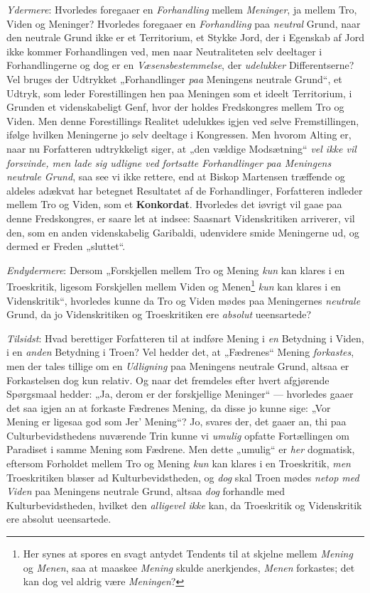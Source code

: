 \documentclass[12pt,a4paper]{book}
\newcommand{\opage}[1]{\marginnote{\footnotesize\textit{[#1]}}}
\begin{document}
\emph{Ydermere}: Hvorledes foregaaer en \emph{Forhandling}
mellem \emph{Meninger}, ja mellem Tro, Viden og
Meninger? Hvorledes foregaaer en \emph{Forhandling} paa
\emph{neutral} Grund, naar den neutrale Grund ikke er et
Territorium, et Stykke Jord, der i Egenskab af Jord
ikke kommer Forhandlingen ved, men naar Neutraliteten
selv deeltager i Forhandlingerne og dog er en \emph{Væsensbestemmelse},
der \emph{udelukker} Differentserne? Vel
bruges der Udtrykket „Forhandlinger \emph{paa} Meningens
neutrale Grund“, et Udtryk, som leder Forestillingen
hen paa Meningen som et ideelt Territorium, i Grunden
et videnskabeligt Genf, hvor der holdes Fredskongres
mellem Tro og Viden. Men denne Forestillings Realitet
udelukkes igjen ved selve Fremstillingen, ifølge hvilken
Meningerne jo selv deeltage i Kongressen. Men hvorom
Alting er, naar nu Forfatteren udtrykkeligt siger, at „den
vældige Modsætning“ \emph{vel ikke vil forsvinde, men
lade sig udligne ved fortsatte Forhandlinger
paa Meningens neutrale Grund}, saa see vi ikke
rettere, end at Biskop Martensen træffende og aldeles adækvat
har betegnet Resultatet af de Forhandlinger, Forfatteren
indleder mellem Tro og Viden, som et \textbf{Konkordat}.
Hvorledes det iøvrigt vil gaae paa denne Fredskongres,
er saare let at indsee: Saasnart Videnskritiken arriverer,
\opage{78}\setcounter{footnote}{0}vil den, som en anden videnskabelig Garibaldi, udenvidere
smide Meningerne ud, og dermed er Freden „sluttet“.

\emph{Endydermere}: Dersom „Forskjellen mellem Tro
og Mening \emph{kun} kan klares i en Troeskritik, ligesom
Forskjellen mellem Viden og Menen\footnote{Her synes at spores en svagt antydet Tendents til at skjelne
mellem \emph{Mening} og \emph{Menen}, saa at maaskee \emph{Mening}
skulde anerkjendes, \emph{Menen} forkastes; det kan dog vel aldrig
være \emph{Meningen}?} \emph{kun} kan klares i
en Videnskritik“, hvorledes kunne da Tro og Viden mødes
paa Meningernes \emph{neutrale} Grund, da jo Videnskritiken
og Troeskritiken ere \emph{absolut} ueensartede?

\emph{Tilsidst}: Hvad berettiger Forfatteren til at indføre
Mening i \emph{en} Betydning i Viden, i en \emph{anden}
Betydning i Troen? Vel hedder det, at „Fædrenes“
Mening \emph{forkastes}, men der tales tillige om en \emph{Udligning}
paa Meningens neutrale Grund, altsaa er
Forkastelsen dog kun relativ. Og naar det fremdeles
efter hvert afgjørende Spørgsmaal hedder: „Ja, derom
er der forskjellige Meninger“ --- hvorledes gaaer det
saa igjen an at forkaste Fædrenes Mening, da disse
jo kunne sige: „Vor Mening er ligesaa god som Jer'
Mening“? Jo, svares der, det gaaer an, thi paa
Culturbevidsthedens nuværende Trin kunne vi \emph{umulig}
opfatte Fortællingen om Paradiset i samme Mening som
Fædrene. Men dette „umulig“ er \emph{her} dogmatisk, eftersom
Forholdet mellem Tro og Mening \emph{kun} kan klares
i en Troeskritik, \emph{men} Troeskritiken blæser ad Kulturbevidstheden,
og \emph{dog} skal Troen mødes \emph{netop med}
\opage{79}\setcounter{footnote}{0}%
\emph{Viden} paa Meningens neutrale Grund, altsaa \emph{dog}
forhandle med Kulturbevidstheden, hvilket den \emph{alligevel
ikke} kan, da Troeskritik og Videnskritik ere absolut
ueensartede.
\end{document}
